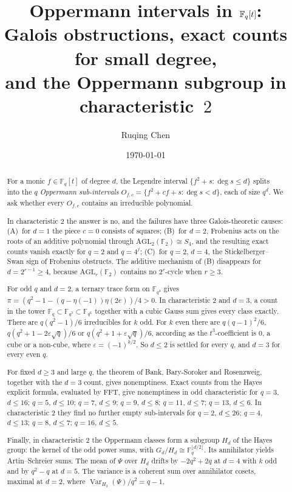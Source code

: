 \documentclass[11pt,a4paper]{amsart}
\title[{Oppermann intervals in $\F_q[t]$}]{Oppermann intervals in $\F_q[t]$:\\
Galois obstructions, exact counts for small degree,\\ and the Oppermann subgroup in characteristic~$2$}
\author{Ruqing Chen}
\date{\today}
\theoremstyle{definition}
\theoremstyle{remark}
\newcommand{\F}{\mathbb{F}}
\newcommand{\AGL}{\mathrm{AGL}}
\newcommand{\Var}{\operatorname{Var}}
\begin{document}
\begin{abstract}
For a monic $f\in\F_q[t]$ of degree $d$, the Legendre interval $\{f^2+s:\deg s\le d\}$ splits into the $q$
\emph{Oppermann sub-intervals} $O_{f,c}=\{f^2+cf+s:\deg s<d\}$, each of size $q^d$. We ask whether every $O_{f,c}$
contains an irreducible polynomial.

In characteristic $2$ the answer is no, and the failures have three Galois-theoretic causes:
(A)~for $d=1$ the piece $c=0$ consists of squares; (B)~for $d=2$, Frobenius acts on the roots of an additive
polynomial through $\AGL_2(\F_2)\cong S_4$, and the resulting exact counts vanish exactly for $q=2$ and $q=4^j$;
(C)~for $q=2$, $d=4$, the Stickelberger--Swan sign of Frobenius obstructs. The additive mechanism of (B) disappears
for $d=2^{r-1}\ge4$, because $\AGL_r(\F_2)$ contains no $2^r$-cycle when $r\ge3$.

For odd $q$ and $d=2$, a ternary trace form on $\F_{q^4}$ gives $\pi=(q^2-1-(q-\eta(-1))\eta(2e))/4>0$. In
characteristic $2$ and $d=3$, a count in the tower $\F_q\subset\F_{q^3}\subset\F_{q^6}$ together with a cubic Gauss sum
gives every class exactly. There are $q(q^2-1)/6$ irreducibles for $k$ odd. For $k$ even there are
$q(q-1)^2/6$, $q(q^2+1-2\varepsilon\sqrt q)/6$ or $q(q^2+1+\varepsilon\sqrt q)/6$, according as the $t^3$-coefficient
is $0$, a cube or a non-cube, where $\varepsilon=(-1)^{k/2}$. So $d\le2$ is settled for every $q$, and $d=3$ for
every even $q$.

For fixed $d\ge3$ and large $q$, the theorem of Bank, Bary-Soroker and Rosenzweig, together with the $d=3$ count,
gives nonemptiness. Exact counts from the Hayes explicit formula, evaluated by FFT, give nonemptiness in odd
characteristic for $q=3$, $d\le16$; $q=5$, $d\le10$; $q=7$, $d\le9$; $q=9$, $d\le8$; $q=11$, $d\le7$; $q=13$, $d\le6$.
In characteristic $2$ they find no further empty sub-intervals for $q=2$, $d\le26$; $q=4$, $d\le13$; $q=8$, $d\le7$;
$q=16$, $d\le5$.

Finally, in characteristic $2$ the Oppermann classes form a subgroup $H_d$ of the Hayes group: the kernel of the odd
power sums, with $G_d/H_d\cong\F_q^{\lfloor d/2\rfloor}$. Its annihilator yields Artin--Schreier sums. The mean of
$\Psi$ over $H_d$ drifts by $-2q^2+2q$ at $d=4$ with $k$ odd and by $q^2-q$ at $d=5$. The variance is a coherent sum
over annihilator cosets, maximal at $d=2$, where $\Var_{H_2}(\Psi)/q^2=q-1$.
\end{abstract}

\maketitle
\end{document}
